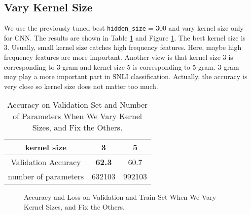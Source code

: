\documentclass[10pt,a4paper]{article}
\begin{document}
\subsection{Vary Kernel Size}
We use the previously tuned best \texttt{hidden\_size} = 300 and vary kernel size only for CNN. The results are shown in Table \ref{tab: kernel} and Figure \ref{fig: kernel}. The best kernel size is 3. Usually, small kernel size catches high frequency features. Here, maybe high frequency features are more important. Another view is that kernel size 3 is corresponding to 3-gram and kernel size 5 is corresponding to 5-gram. 3-gram may play a more important part in SNLI classification. Actually, the accuracy is very close so kernel size does not matter too much.
\begin{table}[!ht]
\centering
\begin{tabular}{|c|c|c|}
\hline
kernel size & 3 & 5\\ \hline
Validation Accuracy & \textbf{62.3} & 60.7\\ \hline
number of parameters & 632103 & 992103 \\ \hline
\end{tabular}
\caption{\label{tab: kernel}Accuracy on Validation Set and Number of Parameters When We Vary Kernel Sizes, and Fix the Others.}
\end{table}
\begin{figure}[!ht]
\centering
{}
\caption{\label{fig: kernel}Accuracy and Loss on Validation and Train Set When We Vary Kernel Sizes, and Fix the Others.}
\end{figure}
\end{document}

